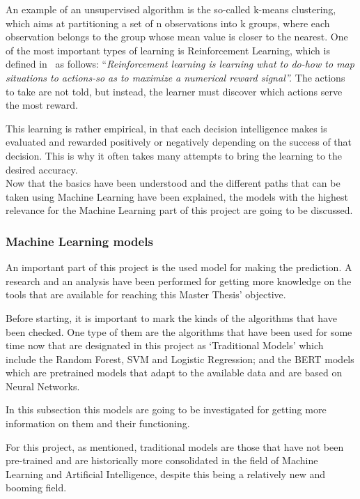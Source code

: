 
An example of an unsupervised algorithm is the so-called k-means clustering, which aims at partitioning a set of n observations into k groups, where each observation belongs to the group whose mean value is closer to the nearest.
One of the most important types of learning is Reinforcement Learning, which is defined in~\cite{sutton2018reinforcement} as follows: ``\textit{Reinforcement learning is learning what to do-how to map situations to actions-so as to maximize a numerical reward signal''.}  The actions to take are not told, but instead, the learner must discover which actions serve the most reward.

This learning is rather empirical, in that each decision intelligence makes is evaluated and rewarded positively or negatively depending on the success of that decision. This is why it often takes many attempts to bring the learning to the desired accuracy.\\

Now that the basics have been understood and the different paths that can be taken using Machine Learning have been explained, the models with the highest relevance for the Machine Learning part of this project are going to be discussed.

\subsubsection{Machine Learning models}
An important part of this project is the used model for making the prediction. A research and an analysis have been performed for getting more knowledge on the tools that are available for reaching this Master Thesis' objective.

Before starting, it is important to mark the kinds of the algorithms that have been checked. One type of them are the algorithms that have been used for some time now that are designated in this project as `Traditional Models' which include the Random Forest, SVM and Logistic Regression; and the BERT models which are pretrained models that adapt to the available data and are based on Neural Networks.

In this subsection this models are going to be investigated for getting more information on them and their functioning.

For this project, as mentioned, traditional models are those that have not been pre-trained and are historically more consolidated in the field of Machine Learning and Artificial Intelligence, despite this being a relatively new and booming field.

